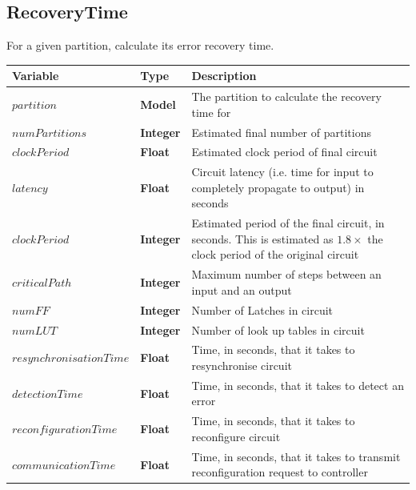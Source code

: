 \documentclass[12pt,final,oneside,a4paper]{dwThesis} %
\begin{document}
   \newpage 
   \subsection{RecoveryTime}
   For a given partition, calculate its
   error recovery time.  
   \begin{algorithm}

      \begin{center}


         \begin{tabularx}
            {\linewidth}{llX} \toprule Variable & Type &
            Description\\
            \midrule
            $partition$ & \textbf{Model} & The partition to calculate the recovery time for\\
            $numPartitions$ &\textbf{Integer } &  Estimated final number of partitions \\
            $clockPeriod$ & \textbf{Float} & Estimated clock period of final circuit\\$latency$ &\textbf{Float } &  Circuit
            latency (i.e. time for input to completely propagate to output) in
            seconds\\
            $clockPeriod$ &\textbf{Integer } & Estimated period of
            the final circuit, in seconds. This is estimated as $1.8\times$ the
            clock period of the original circuit\\
            $criticalPath$ &\textbf{Integer } &  Maximum number of steps between an input and an
            output\\
            $numFF$ &\textbf{Integer } &  Number of Latches in
            circuit\\
            $numLUT$ &\textbf{Integer } &  Number of look up tables
            in circuit\\
            $resynchronisationTime$ &\textbf{Float } &  Time, in
            seconds, that it takes to resynchronise circuit\\
            $detectionTime$
            &\textbf{Float } &  Time, in seconds, that it takes to detect an
            error\\
            $reconfigurationTime$ &\textbf{Float } &  Time, in
            seconds, that it takes to reconfigure circuit\\
            $communicationTime$
            &\textbf{Float } &  Time, in seconds, that it takes to transmit
            reconfiguration request to controller\\
            \bottomrule


\end{tabularx}
\end{center}
\end{algorithm}
\end{document}
